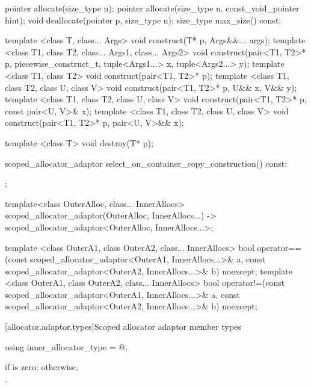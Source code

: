 \begin{codeblock}
{{    pointer allocate(size_type n);
    pointer allocate(size_type n, const_void_pointer hint);
    void deallocate(pointer p, size_type n);
    size_type max_size() const;

    template <class T, class... Args>
      void construct(T* p, Args&&... args);
    template <class T1, class T2, class... Args1, class... Args2>
      void construct(pair<T1, T2>* p, piecewise_construct_t,
                     tuple<Args1...> x, tuple<Args2...> y);
    template <class T1, class T2>
      void construct(pair<T1, T2>* p);
    template <class T1, class T2, class U, class V>
      void construct(pair<T1, T2>* p, U&& x, V&& y);
    template <class T1, class T2, class U, class V>
      void construct(pair<T1, T2>* p, const pair<U, V>& x);
    template <class T1, class T2, class U, class V>
      void construct(pair<T1, T2>* p, pair<U, V>&& x);

    template <class T>
      void destroy(T* p);

    scoped_allocator_adaptor select_on_container_copy_construction() const;
  };

  template<class OuterAlloc, class... InnerAllocs>
    scoped_allocator_adaptor(OuterAlloc, InnerAllocs...)
      -> scoped_allocator_adaptor<OuterAlloc, InnerAllocs...>;

  template <class OuterA1, class OuterA2, class... InnerAllocs>
    bool operator==(const scoped_allocator_adaptor<OuterA1, InnerAllocs...>& a,
                    const scoped_allocator_adaptor<OuterA2, InnerAllocs...>& b) noexcept;
  template <class OuterA1, class OuterA2, class... InnerAllocs>
    bool operator!=(const scoped_allocator_adaptor<OuterA1, InnerAllocs...>& a,
                    const scoped_allocator_adaptor<OuterA2, InnerAllocs...>& b) noexcept;
}
\end{codeblock}

[allocator.adaptor.types]{Scoped allocator adaptor member types}

%
\begin{itemdecl}
using inner_allocator_type = @\seebelow@;
\end{itemdecl}

\begin{itemdescr}
\pnum
\ctype {} if  is
zero; otherwise,\\ .
\end{itemdescr}

